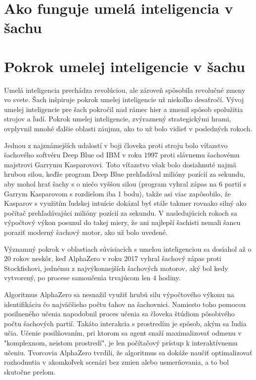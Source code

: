 \documentclass[10pt,oneside,slovak,a4paper]{article}
\begin{document}
\section{Ako funguje umelá inteligencia v šachu}

\section{Pokrok umelej inteligencie v šachu}

Umelá inteligencia prechádza revolúciou, ale zároveň spôsobila revolučné zmeny vo svete. Šach inšpiruje pokrok umelej inteligencie už niekoľko desaťročí. Vývoj umelej inteligencie pre šach pokročil nad rámec hier a zmenil spôsob spolužitia strojov a ľudí. Pokrok umelej inteligencie, zvýraznený strategickými hrami, ovplyvnil mnohé ďalšie oblasti záujmu, ako to už bolo vidieť v posledných rokoch.

Jednou z najznámejších udalostí v boji človeka proti stroju bolo víťazstvo šachového softvéru Deep Blue od IBM v roku 1997 proti slávnemu šachovému majstrovi Garrymu Kasparovovi. Toto víťazstvo však bolo dosiahnuté najmä hrubou silou, keďže program Deep Blue prehľadával milióny pozícií za sekundu, aby mohol hrať šachy s o niečo vyššou silou (program vyhral zápas na 6 partií s Garrym Kasparovom s rozdielom iba 1 bodu), takže asi viac zapôsobilo, že Kasparov s využitím ľudskej intuície dokázal byť stále takmer rovnako silný ako počítač prehľadávajúci milióny pozícií za sekundu. V nasledujúcich rokoch sa výpočtový výkon posunul do takej miery, že ani najlepší šachisti nemali šancu poraziť moderný šachový motor, ako už bolo uvedené.

Významný pokrok v oblastiach súvisiacich s umelou inteligenciou sa dosiahol až o 20 rokov neskôr, keď AlphaZero v roku 2017 vyhral šachový zápas proti Stockfishovi, jednému z najvýkonnejších šachových motorov, aký bol kedy vytvorený, po procese samoučenia trvajúcom len 4 hodiny.

Algoritmus AlphaZero sa nesnažil využiť hrubú silu výpočtového výkonu na identifikáciu čo najväčšieho počtu ťahov na šachovnici. Namiesto toho pomocou posilneného učenia napodobnil proces učenia sa človeka štúdiom pôsobivého počtu šachových partií. Takáto interakcia s prostredím je spôsob, akým sa ľudia učia. Učenie posilňovaním, pri ktorom sa agent snaží maximalizovať odmenu v "komplexnom, neistom prostredí", je len počítačový prístup k interaktívnemu učeniu. Tvorcovia AlphaZero tvrdili, že algoritmus sa dokáže naučiť optimalizovať rozhodnutia v akomkoľvek scenári bez zmien alebo usmerňovania, a to bol skutočne prelom.
\end{document}
